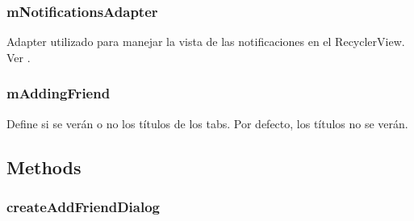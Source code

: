 \documentclass[letterpaper,10pt,english]{sphinxmanual}
\begin{document}
\subsubsection{mNotificationsAdapter}
\label{Fragments/NotificationsFragment:mnotificationsadapter}

\begin{fulllineitems}
\label{Fragments/NotificationsFragment:com.fiuba.tallerii.jobify.NotificationsFragment.mNotificationsAdapter}
Adapter utilizado para manejar la vista de las notificaciones en el RecyclerView. Ver .

\end{fulllineitems}



\subsubsection{mAddingFriend}
\label{Fragments/NotificationsFragment:maddingfriend}

\begin{fulllineitems}
\label{Fragments/NotificationsFragment:com.fiuba.tallerii.jobify.NotificationsFragment.mAddingFriend}
Define si se verán o no los títulos de los tabs. Por defecto, los títulos no se verán.

\end{fulllineitems}



\subsection{Methods}
\label{Fragments/NotificationsFragment:methods}

\subsubsection{createAddFriendDialog}
\label{Fragments/NotificationsFragment:createaddfrienddialog}
\end{document}
